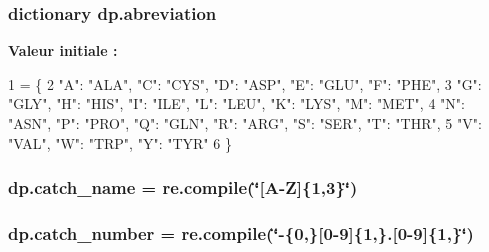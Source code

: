\subsubsection[{\texorpdfstring{abreviation}{abreviation}}]{\setlength{\rightskip}{0pt plus 5cm}dictionary dp.\+abreviation}\hypertarget{namespacedp_aea761b6036de4d26e987f953c9567e16}{}\label{namespacedp_aea761b6036de4d26e987f953c9567e16}
{\bfseries Valeur initiale \+:}
\begin{DoxyCode}
1 = \{
2         \textcolor{stringliteral}{"A"}: \textcolor{stringliteral}{"ALA"}, \textcolor{stringliteral}{"C"}: \textcolor{stringliteral}{"CYS"}, \textcolor{stringliteral}{"D"}: \textcolor{stringliteral}{"ASP"}, \textcolor{stringliteral}{"E"}: \textcolor{stringliteral}{"GLU"}, \textcolor{stringliteral}{"F"}: \textcolor{stringliteral}{"PHE"},
3         \textcolor{stringliteral}{"G"}: \textcolor{stringliteral}{"GLY"}, \textcolor{stringliteral}{"H"}: \textcolor{stringliteral}{"HIS"}, \textcolor{stringliteral}{"I"}: \textcolor{stringliteral}{"ILE"}, \textcolor{stringliteral}{"L"}: \textcolor{stringliteral}{"LEU"}, \textcolor{stringliteral}{"K"}: \textcolor{stringliteral}{"LYS"}, \textcolor{stringliteral}{"M"}: \textcolor{stringliteral}{"MET"},
4         \textcolor{stringliteral}{"N"}: \textcolor{stringliteral}{"ASN"}, \textcolor{stringliteral}{"P"}: \textcolor{stringliteral}{"PRO"}, \textcolor{stringliteral}{"Q"}: \textcolor{stringliteral}{"GLN"}, \textcolor{stringliteral}{"R": "}ARG", "S": "SER", "T": "THR",
5         \textcolor{stringliteral}{"V"}: \textcolor{stringliteral}{"VAL"}, \textcolor{stringliteral}{"W"}: \textcolor{stringliteral}{"TRP"}, \textcolor{stringliteral}{"Y"}: \textcolor{stringliteral}{"TYR"}
6     \}
\end{DoxyCode}
\subsubsection[{\texorpdfstring{catch\+\_\+name}{catch_name}}]{\setlength{\rightskip}{0pt plus 5cm}dp.\+catch\+\_\+name = re.\+compile(\char`\"{}\mbox{[}A-\/Z\mbox{]}\{1,3\}\char`\"{})}\hypertarget{namespacedp_aff02c78936c69d1c43ce85271bb6324c}{}\label{namespacedp_aff02c78936c69d1c43ce85271bb6324c}
\subsubsection[{\texorpdfstring{catch\+\_\+number}{catch_number}}]{\setlength{\rightskip}{0pt plus 5cm}dp.\+catch\+\_\+number = re.\+compile(\char`\"{}-\/\{0,\}\mbox{[}0-\/9\mbox{]}\{1,\}.\mbox{[}0-\/9\mbox{]}\{1,\}\char`\"{})}\hypertarget{namespacedp_a18cc131ff5220f66fa5cf95066d82ed5}{}\label{namespacedp_a18cc131ff5220f66fa5cf95066d82ed5}
